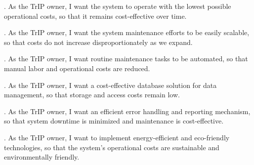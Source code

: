 . As the TrIP owner, I want the system to operate with the lowest possible operational costs, so that it remains cost-effective over time.

. As the TrIP owner, I want the system maintenance efforts to be easily scalable, so that costs do not increase disproportionately as we expand.

. As the TrIP owner, I want routine maintenance tasks to be automated, so that manual labor and operational costs are reduced.

. As the TrIP owner, I want a cost-effective database solution for data management, so that storage and access costs remain low.

. As the TrIP owner, I want an efficient error handling and reporting mechanism, so that system downtime is minimized and maintenance is cost-effective.

. As the TrIP owner, I want to implement energy-efficient and eco-friendly technologies, so that the system's operational costs are sustainable and environmentally friendly.
